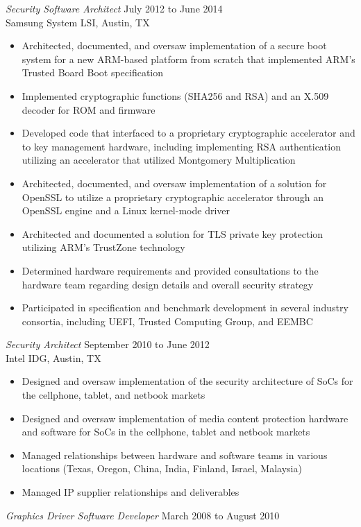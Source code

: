 \documentclass[overlapped]{res}
\begin{document}
\begin{resume}
{\sl Security Software Architect} \hfill July 2012 to June 2014 \\
	Samsung System LSI, Austin, TX
\begin{itemize}
	\item Architected, documented, and oversaw implementation of a secure boot system for a new ARM-based platform from scratch that implemented ARM's Trusted Board Boot specification
	\item Implemented cryptographic functions (SHA256 and RSA) and an X.509 decoder for ROM and firmware
	\item Developed code that interfaced to a proprietary cryptographic accelerator and to key management hardware, including implementing RSA authentication utilizing an accelerator that utilized Montgomery Multiplication
	\item Architected, documented, and oversaw implementation of a solution for OpenSSL to utilize a proprietary cryptographic accelerator through an OpenSSL engine and a Linux kernel-mode driver
	\item Architected and documented a solution for TLS private key protection utilizing ARM's TrustZone technology
	\item Determined hardware requirements and provided consultations to the hardware team regarding design details and overall security strategy
	\item Participated in specification and benchmark development in several industry consortia, including UEFI, Trusted Computing Group, and EEMBC
\end{itemize}
{\sl Security Architect} \hfill September 2010 to June 2012 \\
	Intel IDG, Austin, TX
\begin{itemize}
	\item Designed and oversaw implementation of the security architecture of SoCs for the cellphone, tablet, and netbook markets
	\item Designed and oversaw implementation of media content protection hardware and software for SoCs in the cellphone, tablet and netbook markets
	\item Managed relationships between hardware and software teams in various locations (Texas, Oregon, China, India, Finland, Israel, Malaysia) 
	\item Managed IP supplier relationships and deliverables
\end{itemize}
{\sl Graphics Driver Software Developer} \hfill March 2008 to August 2010 \\

\end{resume}
\end{document}

